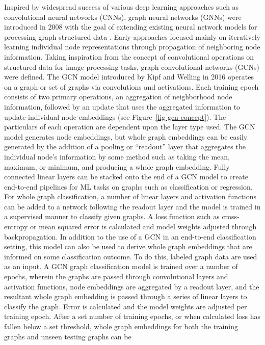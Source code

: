 \documentclass[
  super,
  preprint,
  3p]{elsarticle}
\begin{document}
Inspired by widespread success of various deep learning approaches such
as convolutional neural networks (CNNs), graph neural networks (GNNs)
were introduced in 2008 with the goal of extending existing neural
network models for processing graph structured data
\citep{scarselli_graph_2009}. Early approaches focused mainly on
iteratively learning individual node representations through propagation
of neighboring node information. Taking inspiration from the concept of
convolutional operations on structured data for image processing tasks,
graph convolutional networks (GCNs) were defined. The GCN model
introduced by Kipf and Welling in 2016 \citep{kipf_2017} operates on a
graph or set of graphs via convolutions and activations. Each training
epoch consists of two primary operations, an aggregation of neighborhood
node information, followed by an update that uses the aggregated
information to update individual node embeddings (see
Figure~\ref{fig-gcn-concept}). The particulars of each operation are
dependent upon the layer type used. The GCN model generates node
embeddings, but whole graph embeddings can be easily generated by the
addition of a pooling or ``readout'' layer that aggregates the
individual node's information by some method such as taking the mean,
maximum, or minimum, and producing a whole graph embedding. Fully
connected linear layers can be stacked onto the end of a GCN model to
create end-to-end pipelines for ML tasks on graphs such as
classification or regression. For whole graph classification, a number
of linear layers and activation functions can be added to a network
following the readout layer and the model is trained in a supervised
manner to classify given graphs. A loss function such as cross-entropy
or mean squared error is calculated and model weights adjusted through
backpropagation. In addition to the use of a GCN in an end-to-end
classification setting, this model can also be used to derive whole
graph embeddings that are informed on some classification outcome. To do
this, labeled graph data are used as an input. A GCN graph
classification model is trained over a number of epochs, wherein the
graphs are passed through convolutional layers and activation functions,
node embeddings are aggregated by a readout layer, and the resultant
whole graph embedding is passed through a series of linear layers to
classify the graph. Error is calculated and the model weights are
adjusted per training epoch. After a set number of training epochs, or
when calculated loss has fallen below a set threshold, whole graph
embeddings for both the training graphs and unseen testing graphs can be
\end{document}
